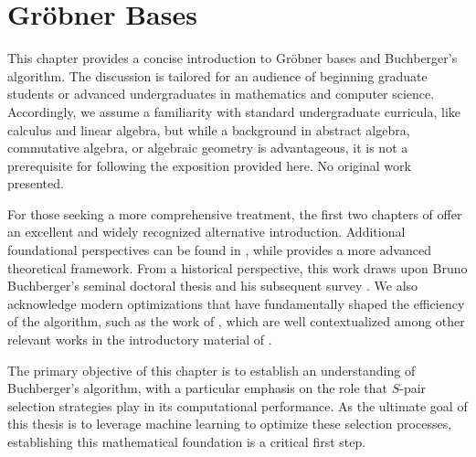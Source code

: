 \chapter{Gröbner Bases}

This chapter provides a concise introduction to Gröbner bases and Buchberger's algorithm. The discussion is tailored for an audience of beginning graduate students or advanced undergraduates in mathematics and computer science. Accordingly, we assume a familiarity with standard undergraduate curricula, like calculus and linear algebra, but while a background in abstract algebra, commutative algebra, or algebraic geometry is advantageous, it is not a prerequisite for following the exposition provided here. No original work presented.

For those seeking a more comprehensive treatment, the first two chapters of \cite{cox2015_IVA} offer an excellent and widely recognized alternative introduction. Additional foundational perspectives can be found in \cite{cox2005_UAG, Kreuzer2000_CAG, Sturmfels2005_WhatIsGB}, while \cite{Adams1994_IGB} provides a more advanced theoretical framework. From a historical perspective, this work draws upon Bruno Buchberger's seminal doctoral thesis \cite{Buchberger1965_algorithmGerman, Buchberger1965_algorithmEnglish} and his subsequent survey \cite{Buchberger1985_SurveyArticle}. We also acknowledge modern optimizations that have fundamentally shaped the efficiency of the algorithm, such as the work of \cite{Gebauer1988_InstallationOfGB, Giovini1991_OneSugarCube, Sun2011_F5InBuchbergersStyle}, which are well contextualized among other relevant works in the introductory material of \cite{Eder2012_SignatureBasedAlgorithms}.

The primary objective of this chapter is to establish an understanding of Buchberger's algorithm, with a particular emphasis on the role that $S$-pair selection strategies play in its computational performance. As the ultimate goal of this thesis is to leverage machine learning to optimize these selection processes, establishing this mathematical foundation is a critical first step.